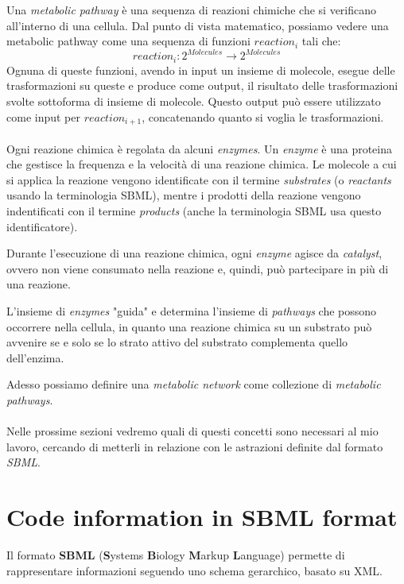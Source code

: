 Una \emph{metabolic pathway} \`e una sequenza di reazioni chimiche che
si verificano all'interno di una cellula. Dal punto di vista
matematico, possiamo vedere una metabolic pathway come una sequenza di
funzioni $reaction_{i}$ tali che:
\begin{displaymath}
reaction_{i} : 2^{Molecules} \rightarrow 2^{Molecules}
\end{displaymath}
Ognuna di queste funzioni, avendo in input un insieme di molecole,
esegue delle trasformazioni su queste e produce come output, il
risultato delle trasformazioni svolte sottoforma di insieme di
molecole. Questo output pu\`o essere utilizzato come input per
$reaction_{i+1}$, concatenando quanto si voglia le trasformazioni.
\\\\
Ogni reazione chimica \`e regolata da alcuni \emph{enzymes}. Un
\emph{enzyme} \`e una proteina che gestisce la frequenza e la
velocit\`a di una reazione chimica. Le molecole a cui si applica la
reazione vengono identificate con il termine \emph{substrates} (o
\emph{reactants} usando la terminologia SBML), mentre i prodotti della
reazione vengono indentificati con il termine \emph{products} (anche
la terminologia SBML usa questo identificatore).

Durante l'esecuzione di una reazione chimica, ogni \emph{enzyme}
agisce da \emph{catalyst}, ovvero non viene consumato nella reazione
e, quindi, pu\`o partecipare in pi\`u di una reazione.

L'insieme di \emph{enzymes} "guida" e determina l'insieme di
\emph{pathways} che possono occorrere nella cellula, in quanto una
reazione chimica su un substrato pu\`o avvenire se e solo se lo strato
attivo del substrato complementa quello dell'enzima.

Adesso possiamo definire una \emph{metabolic network} come collezione
di \emph{metabolic pathways}.
\\\\
Nelle prossime sezioni vedremo quali di questi concetti sono necessari
al mio lavoro, cercando di metterli in relazione con le astrazioni
definite dal formato \emph{SBML}.

\section{Code information in SBML format}
Il formato \textbf{SBML} (\textbf{S}ystems \textbf{B}iology
\textbf{M}arkup \textbf{L}anguage) permette di rappresentare
informazioni seguendo uno schema gerarchico, basato su XML.

